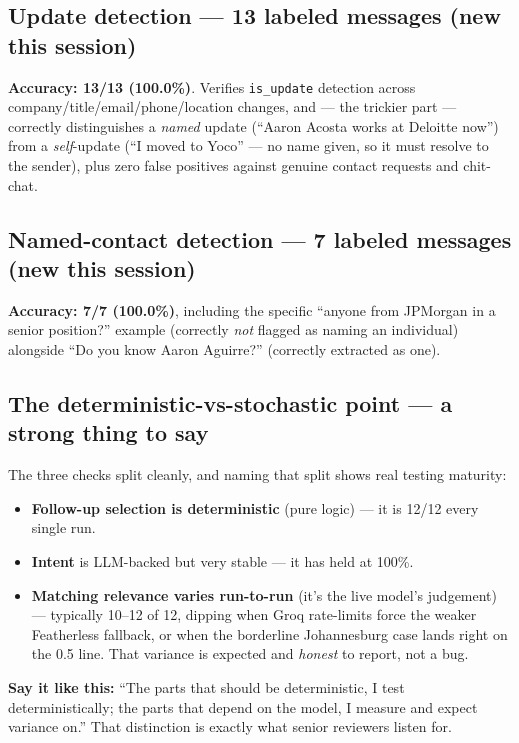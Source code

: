 \documentclass[11pt, a4paper]{article}
\newcommand{\good}[1]{\textcolor{good}{\textbf{#1}}}
\begin{document}
\subsection{Update detection --- 13 labeled messages (new this session)}
\textbf{Accuracy: \good{13/13 (100.0\%)}}. Verifies \texttt{is\_update} detection across company/title/email/phone/location changes, and --- the trickier part --- correctly distinguishes a \emph{named} update (``Aaron Acosta works at Deloitte now'') from a \emph{self}-update (``I moved to Yoco'' --- no name given, so it must resolve to the sender), plus zero false positives against genuine contact requests and chit-chat.

\subsection{Named-contact detection --- 7 labeled messages (new this session)}
\textbf{Accuracy: \good{7/7 (100.0\%)}}, including the specific ``anyone from JPMorgan in a senior position?'' example (correctly \emph{not} flagged as naming an individual) alongside ``Do you know Aaron Aguirre?'' (correctly extracted as one).

\subsection{The deterministic-vs-stochastic point --- a strong thing to say}
The three checks split cleanly, and naming that split shows real testing maturity:
\begin{itemize}
    \item \textbf{Follow-up selection is deterministic} (pure logic) --- it is 12/12 every single run.
    \item \textbf{Intent} is LLM-backed but very stable --- it has held at 100\%.
    \item \textbf{Matching relevance varies run-to-run} (it's the live model's judgement) --- typically 10--12 of 12, dipping when Groq rate-limits force the weaker Featherless fallback, or when the borderline Johannesburg case lands right on the 0.5 line. That variance is expected and \emph{honest} to report, not a bug.
\end{itemize}
\textbf{Say it like this:} ``The parts that should be deterministic, I test deterministically; the parts that depend on the model, I measure and expect variance on.'' That distinction is exactly what senior reviewers listen for.
\end{document}
